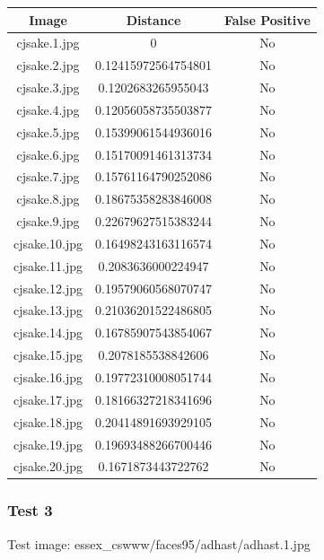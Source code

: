 \documentclass[12pt]{article}
\begin{document}
\begin{center}
\begin{tabular}{ccc}
Image & Distance & False Positive \\
\hline
cjsake.1.jpg & 0 & No \\
cjsake.2.jpg & 0.12415972564754801 & No \\
cjsake.3.jpg & 0.1202683265955043 & No \\
cjsake.4.jpg & 0.12056058735503877 & No \\
cjsake.5.jpg & 0.15399061544936016 & No \\
cjsake.6.jpg & 0.15170091461313734 & No \\
cjsake.7.jpg & 0.15761164790252086 & No \\
cjsake.8.jpg & 0.18675358283846008 & No \\
cjsake.9.jpg & 0.22679627515383244 & No \\
cjsake.10.jpg & 0.16498243163116574 & No \\
cjsake.11.jpg & 0.2083636000224947 & No \\
cjsake.12.jpg & 0.19579060568070747 & No \\
cjsake.13.jpg & 0.21036201522486805 & No \\
cjsake.14.jpg & 0.16785907543854067 & No \\
cjsake.15.jpg & 0.2078185538842606 & No \\
cjsake.16.jpg & 0.19772310008051744 & No \\
cjsake.17.jpg & 0.18166327218341696 & No \\
cjsake.18.jpg & 0.20414891693929105 & No \\
cjsake.19.jpg & 0.19693488266700446 & No \\
cjsake.20.jpg & 0.1671873443722762 & No \\
\end{tabular}
\end{center}

\newpage
\subsubsection{Test 3}
Test image: essex\_cswww/faces95/adhast/adhast.1.jpg
\end{document}
